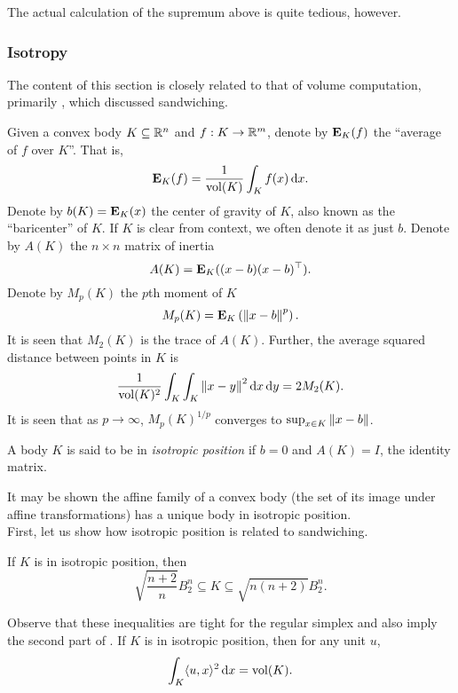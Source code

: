 The actual calculation of the supremum above is quite tedious, however.


\subsubsection{Isotropy}

The content of this section is closely related to that of volume computation, primarily , which discussed sandwiching.

Given a convex body $K\subseteq\mathbb{R}^n$ and $f:K\to\mathbb{R}^m$, denote by $\textbf{E}_K(f)$ the ``average of $f$ over $K$''. That is,
\[ \textbf{E}_K(f) = \frac{1}{\operatorname{vol}(K)} \int_{K} f(x)\operatorname{d}\!{x}. \]
Denote by $b(K)=\textbf{E}_K(x)$ the center of gravity of $K$, also known as the ``baricenter'' of $K$. If $K$ is clear from context, we often denote it as just $b$. Denote by $A(K)$ the $n\times n$ matrix of inertia
\[ A(K) = \textbf{E}_K((x-b)(x-b)^\top). \]
Denote by $M_p(K)$ the $p$th moment of $K$
\[ M_p(K) = \textbf{E}_K\left(\left\lVert x-b\right\rVert^p\right). \]
It is seen that $M_2(K)$ is the trace of $A(K)$. Further, the average squared distance between points in $K$ is
\[ \frac{1}{\operatorname{vol}(K)^2} \int_K \int_K \left\lVert x-y\right\rVert^2\operatorname{d}\!{x}\operatorname{d}\!{y} = 2M_2(K). \]
It is seen that as $p\to\infty$, $M_p(K)^{1/p}$ converges to $\sup_{x\in K} \left\lVert x-b\right\rVert$.

\begin{fdef}
	A body $K$ is said to be in \textit{isotropic position} if $b=0$ and $A(K)=I$, the identity matrix.\footnotemark
\end{fdef}

It may be shown the affine family of a convex body (the set of its image under affine transformations) has a unique body in isotropic position.\\
First, let us show how isotropic position is related to sandwiching.

\begin{ftheo}
	If $K$ is in isotropic position, then
	\[ \sqrt{\frac{n+2}{n}} B_2^n \subseteq K \subseteq \sqrt{n(n+2)}B_2^n. \]
\end{ftheo}

Observe that these inequalities are tight for the regular simplex and also imply the second part of . If $K$ is in isotropic position, then for any unit $u$,
\[ \int_K \langle u,x\rangle^2 \operatorname{d}\!{x} = \operatorname{vol}(K). \]


